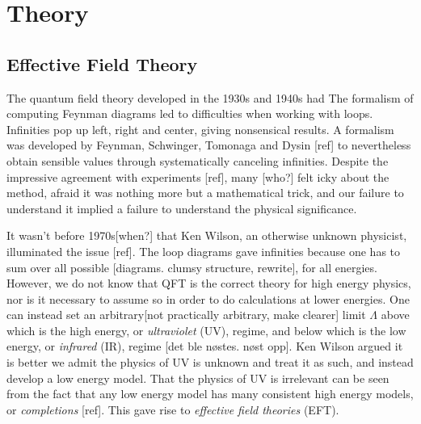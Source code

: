 \section{Theory}\label{sec:Theory}

\newcommand{\state}{\ket{\psi}}
\newcommand{\hoket}{\ket{\phi}}
\newcommand{\hoep}{\ket{\phi +}}
\newcommand{\hoem}{\ket{\phi -}}
\newcommand{\pin}{\psi_\text{in}}
\newcommand{\pout}{\psi_\text{out}}
\newcommand{\kpin}{\ket{\psi_\text{in}}}
\newcommand{\kpout}{\ket{\psi_\text{out}}}
\newcommand{\mop}{\Omega_{+}}
\newcommand{\mom}{\Omega_{-}}
\newcommand{\melt}[3]{\left|\mel{#1}{#2}{#3}\right|^{2}}
\newcommand{\scat}{\mathcal{S}}
\newcommand{\mscat}{\(\scat\)}
\newcommand{\oop}[1]{\mathcal{#1}}
\newcommand{\moop}[1]{\(\oop{#1}\)}
\renewcommand{\vu}[1]{\mathbf{\hat{\text{$#1$}}}}

\subsection{Effective Field Theory}

The quantum field theory developed in the 1930s and 1940s had
The formalism of computing Feynman diagrams led to difficulties when working
with loops. Infinities pop up left, right and center, giving nonsensical
results. A formalism was developed by Feynman, Schwinger, Tomonaga and Dysin [ref] to nevertheless obtain sensible values
through systematically canceling infinities. Despite the impressive agreement with
experiments [ref], many [who?] felt icky about the method, afraid it was nothing
more but a mathematical trick, and our failure to understand it implied a
failure to understand the physical significance.

It wasn't before 1970s[when?] that Ken Wilson, an otherwise unknown physicist,
illuminated the issue [ref]. The loop diagrams gave infinities because one has to sum
over all possible [diagrams. clumsy structure, rewrite], for all energies. However, we do not know
that QFT is the correct theory for high energy physics, nor is it necessary to
assume so in order to do calculations at lower energies. One can instead set an
arbitrary[not practically arbitrary, make clearer] limit \(\Lambda\) above which
is the high energy, or \textit{ultraviolet} (UV), regime, and below which is the low
energy, or \textit{infrared} (IR), regime [det ble nøstes. nøst opp]. Ken Wilson
argued it is better we admit the physics of UV is unknown and treat it as such,
and instead develop a low energy model. That the physics of UV is irrelevant can
be seen from the fact that any low energy model has many consistent high energy
models, or \textit{completions} [ref]. This gave rise to \textit{effective field
  theories} (EFT).

